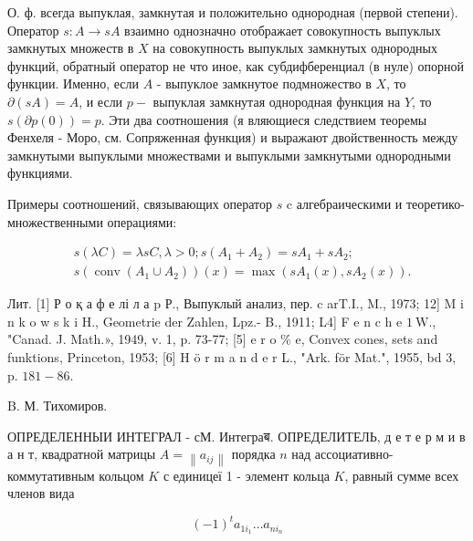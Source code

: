 \documentclass[10pt]{article}
\begin{document}
О. ф. всегда выпуклая, замкнутая и положительно однородная (первой степени). Оператор $s: A \rightarrow s A$ взаимно однозначно отображает совокупность выпуклых замкнутых множеств в $X$ на совокупность выпуклых замкнутых однородных функций, обратный оператор не что иное, как субдифберенциал (в нуле) опорной функции. Именно, если $A$ - выпуклое замкнутое подмножество в $X$, то $\partial(s A)=A$, и если $p-$ выпуклая замкнутая однородная функция на $Y$, то $s(\partial p(0))=p$. Эти два соотношения (я вляющиеся следствием теоремы Фенхеля - Моро, см. Сопряженная функция) и выражают двойственность между замкнутыми выпуклыми множествами и выпуклыми замкнутыми однородными функциями.



Примеры соотношений, связывающих оператор $s$ c алгебраическими и теоретико-множественными операциями:



\[

\begin{aligned}

& s(\lambda C)=\lambda s C, \lambda>0 ; s\left(A_{1}+A_{2}\right)=s A_{1}+s A_{2} ; \\

& s\left(\operatorname{conv}\left(A_{1} \cup A_{2}\right)\right)(x)=\max \left(s A_{1}(x), s A_{2}(x)\right) .

\end{aligned}

\]



Лит. [1] Р о қ а ф е лі л а p Р., Выпуклый анализ, пер. c arT.I., M., 1973; 12] M i n k o w s k i H., Geometrie der Zahlen, Lpz.- B., 1911; L4] F e n c $\mathrm{h}$ e $1 \mathrm{~W}$., "Canad. J. Math.», 1949, v. 1, p. 73-77; [5] e r o \% e, Convex cones, sets and funktions, Princeton, 1953; [6] H ö r m a n d e r L., "Ark. för Mat.", 1955, bd 3, p. $181-86$.



B. М. Тихомиров.



ОПРЕДЕЛЕННЫИ ИНТЕГРАЛ - сМ. Интеграब. ОПРЕДЕЛИТЕЛЬ, д е т е р м и в а н т, квадратной матрицы $A=\left\|a_{i j}\right\|$ порядка $n$ над ассоциативно-коммутативным кольцом $K$ с единицеї 1 - элемент кольца $K$, равный сумме всех членов вида



\[

(-1)^{t} a_{1 i_{1}} \ldots a_{n i_{n}}

\]
\end{document}
